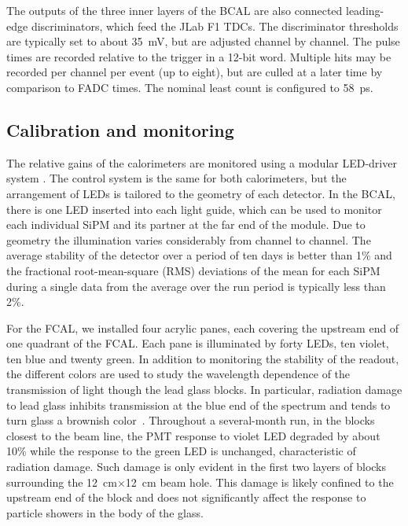 The outputs of the three inner layers of the BCAL are also connected leading-edge discriminators, which feed the JLab F1 TDCs. The discriminator thresholds are typically set to about 35~mV, but are adjusted
 channel by channel.  The pulse times are recorded relative to the trigger in a 12-bit word. Multiple hits may be recorded per channel per event (up to eight), but are culled at a later time by comparison to FADC times. The nominal least count is configured to 58~ps.


\subsection[Calibration and monitoring]{Calibration and monitoring \label{sec:calcalib}}
The relative gains of the calorimeters are monitored using a modular LED-driver system \cite{Anassontzis201441}. The control system is the same for both calorimeters, but the arrangement of LEDs is tailored to the geometry of each detector. In the BCAL, there is one LED inserted into each light guide, which can be used to monitor each individual SiPM and its partner at the far end of the module.
Due to geometry the illumination varies considerably from channel to channel. 
The average stability of the detector over a period of ten days is better than 1\% and the fractional root-mean-square (RMS) deviations of the mean for each SiPM during a single data from the average over the run period is typically less than 2\%.

For the FCAL, we installed four acrylic panes, each covering the upstream end of one quadrant of the FCAL. Each pane is illuminated by forty LEDs, ten violet, ten blue and twenty green. In addition to monitoring the stability of the readout, the different colors are used to study the wavelength dependence of the transmission of light though the lead glass blocks.  In particular, radiation damage to lead glass inhibits transmission at the blue end of the spectrum and tends to turn glass a brownish color~\cite{Schaefer:2011gw}.  Throughout a several-month run, in the blocks closest to the beam line, the PMT response to violet LED degraded by about 10\% while the response to the green LED is unchanged, characteristic of radiation damage.  Such damage is only evident in the first two layers of blocks surrounding the 12~cm$\times$12~cm beam hole. This damage is likely confined to the upstream end of the block and does not significantly affect the response to particle showers in the body of the glass.

